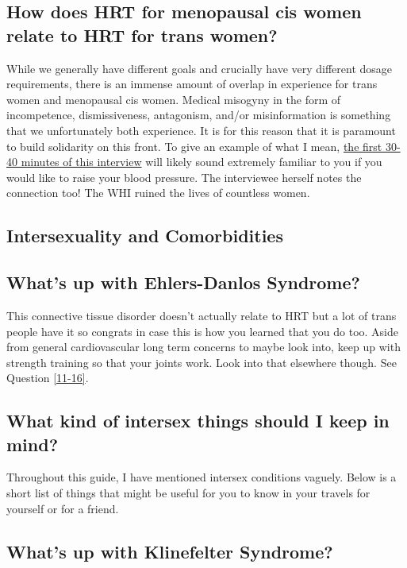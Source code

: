 \documentclass{article}
\begin{document}
\subsection{How does HRT for menopausal cis women relate to HRT for trans women?}\label{11-29}

While we generally have different goals and crucially have very different dosage requirements, there is an immense amount of overlap in experience for trans women and menopausal cis women. Medical misogyny in the form of incompetence, dismissiveness, antagonism, and/or misinformation is something that we unfortunately both experience. It is for this reason that it is paramount to build solidarity on this front. To give an example of what I mean, \href{https://www.youtube.com/watch?v=W0XW6av2wLQ}{the first 30-40 minutes of this interview} will likely sound extremely familiar to you if you would like to raise your blood pressure. The interviewee herself notes the connection too! The WHI ruined the lives of countless women.

\subsection*{Intersexuality and Comorbidities}

\subsection{What’s up with Ehlers-Danlos Syndrome?}

This connective tissue disorder doesn’t actually relate to HRT but a lot of trans people have it so congrats in case this is how you learned that you do too. Aside from general cardiovascular long term concerns to maybe look into, keep up with strength training so that your joints work. Look into that elsewhere though. See Question \ref{11-16}.

\subsection{What kind of intersex things should I keep in mind?}

Throughout this guide, I have mentioned intersex conditions vaguely. Below is a short list of things that might be useful for you to know in your travels for yourself or for a friend. 

\subsection{What’s up with Klinefelter Syndrome?}
\end{document}
